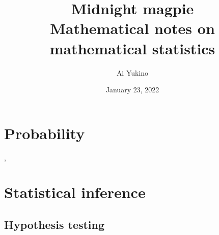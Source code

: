 \documentclass{article}
\begin{document}
\title{Midnight magpie \\
	\large Mathematical notes on mathematical statistics}
\author{Ai Yukino}
\date{January 23, 2022}
\maketitle
\hypersetup{linkcolor = internallinkcolor}
\tableofcontents
\hypersetup{linkcolor= .}

\section{Probability}

\cite{durrett2019}, \cite{tao2015}

\section{Statistical inference}

\cite{siegrist2021}

\subsection{Hypothesis testing}

\cite{siegrist2021}




\end{document}
